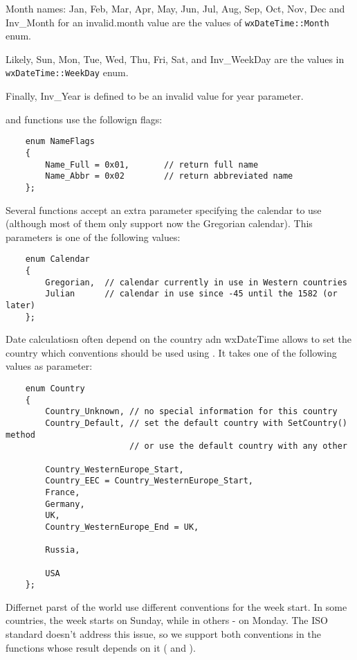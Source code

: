 Month names: Jan, Feb, Mar, Apr, May, Jun, Jul, Aug, Sep, Oct, Nov, Dec and
Inv\_Month for an invalid.month value are the values of {\tt wxDateTime::Month} 
enum.

Likely, Sun, Mon, Tue, Wed, Thu, Fri, Sat, and Inv\_WeekDay are the values in 
{\tt wxDateTime::WeekDay} enum.

Finally, Inv\_Year is defined to be an invalid value for year parameter.

 and 
 functions use the followign
flags:

\begin{verbatim}
    enum NameFlags
    {
        Name_Full = 0x01,       // return full name
        Name_Abbr = 0x02        // return abbreviated name
    };
\end{verbatim}

\label{wxdatetimecalendar}
Several functions accept an extra parameter specifying the calendar to use
(although most of them only support now the Gregorian calendar). This
parameters is one of the following values:

\begin{verbatim}
    enum Calendar
    {
        Gregorian,  // calendar currently in use in Western countries
        Julian      // calendar in use since -45 until the 1582 (or later)
    };
\end{verbatim}

\label{wxdatetimecountry}
Date calculatiosn often depend on the country adn wxDateTime allows to set the
country which conventions should be used using 
. It takes one of the following
values as parameter:

\begin{verbatim}
    enum Country
    {
        Country_Unknown, // no special information for this country
        Country_Default, // set the default country with SetCountry() method
                         // or use the default country with any other

        Country_WesternEurope_Start,
        Country_EEC = Country_WesternEurope_Start,
        France,
        Germany,
        UK,
        Country_WesternEurope_End = UK,

        Russia,

        USA
    };
\end{verbatim}

\label{wxdatetimeweekstart}
Differnet parst of the world use different conventions for the week start.
In some countries, the week starts on Sunday, while in others - on Monday.
The ISO standard doesn't address this issue, so we support both conventions in
the functions whose result depends on it (
 and 
).


